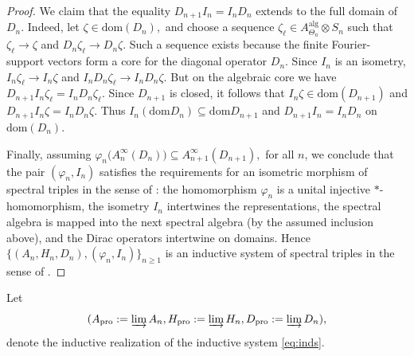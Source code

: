 \documentclass[11pt]{amsart}
\theoremstyle{definition}
\theoremstyle{remark}
\newcommand{\ex}{\mathrm{pro}}
\newcommand{\dom}{\mathrm{dom}}
\begin{document}
\begin{proof}
We claim that the equality $D_{n+1}I_n=I_nD_n$ extends to the full domain of $D_n$. Indeed, let $\zeta\in\dom(D_n),$ and
choose a sequence $\zeta_\ell\in A_{\Theta_n}^{\mathrm{alg}}\otimes S_n$
such that $\zeta_\ell\to \zeta$ and 
$D_n\zeta_\ell\to D_n\zeta.$ Such a sequence exists because the finite Fourier-support vectors form a core
for the diagonal operator $D_n$. Since $I_n$ is an isometry, $I_n\zeta_\ell\to I_n\zeta$ and $I_nD_n\zeta_\ell\to I_nD_n\zeta.$ But on the algebraic core we have $D_{n+1}I_n\zeta_\ell=I_nD_n\zeta_\ell.$
Since $D_{n+1}$ is closed, it follows that $I_n\zeta\in\dom(D_{n+1})$
and $D_{n+1}I_n\zeta=I_nD_n\zeta.$
Thus $I_n(\dom D_n)\subseteq \dom D_{n+1}$ and $D_{n+1}I_n=I_nD_n$
on $\dom(D_n)$.

Finally, assuming $\varphi_n\bigl(A_{n}^{\infty}(D_n)\bigr)\subseteq A_{n+1}^{\infty}(D_{n+1}),$ for all $n$, we conclude that the pair
$(\varphi_n,I_n)$ satisfies the requirements for an isometric morphism of spectral triples in the
sense of \cite[Definition~2.1]{FloricelGhorbanpour}: the homomorphism
$\varphi_n$ is a unital injective $*$-homomorphism, the isometry $I_n$
intertwines the representations, the spectral algebra is mapped into the next
spectral algebra (by the assumed inclusion above), and the Dirac operators
intertwine on domains. Hence $\bigl\{(A_n,H_n,D_n),(\varphi_n,I_n)\bigr\}_{n\geq1}$
is an inductive system of spectral triples in the sense of
\cite[Definition~2.2]{FloricelGhorbanpour}. 
\end{proof}
Let \[ (A_\ex:=\varinjlim A_n,H_\ex:=\varinjlim H_n,D_\ex:=\varinjlim D_n),\] denote the inductive realization of the inductive system \eqref{eq:inds}.
\end{document}

